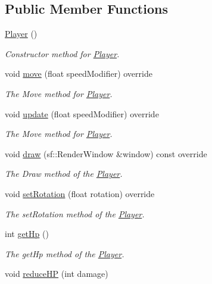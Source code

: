 \subsection*{Public Member Functions}
\begin{DoxyCompactItemize}
\item 
\hyperlink{class_player_affe0cc3cb714f6deb4e62f0c0d3f1fd8}{Player} ()
\begin{DoxyCompactList}\small\item\em Constructor method for \hyperlink{class_player}{Player}. \end{DoxyCompactList}\item 
void \hyperlink{class_player_a79a7509b3cde94c77b79247fa46b13dd}{move} (float speed\+Modifier) override
\begin{DoxyCompactList}\small\item\em The Move method for \hyperlink{class_player}{Player}. \end{DoxyCompactList}\item 
void \hyperlink{class_player_a70e7b6ef62c5b8080e454edcb15cacc8}{update} (float speed\+Modifier) override
\begin{DoxyCompactList}\small\item\em The Move method for \hyperlink{class_player}{Player}. \end{DoxyCompactList}\item 
void \hyperlink{class_player_a5e0147aee1248db63417987b9a203a9a}{draw} (sf\+::\+Render\+Window \&window) const override
\begin{DoxyCompactList}\small\item\em The Draw method of the \hyperlink{class_player}{Player}. \end{DoxyCompactList}\item 
void \hyperlink{class_player_af81c4b00747424065dae4984f4f6c57e}{set\+Rotation} (float rotation) override
\begin{DoxyCompactList}\small\item\em The set\+Rotation method of the \hyperlink{class_player}{Player}. \end{DoxyCompactList}\item 
int \hyperlink{class_player_aa6479f194f9bb44b09adaf3b04a5594d}{get\+Hp} ()
\begin{DoxyCompactList}\small\item\em The get\+Hp method of the \hyperlink{class_player}{Player}. \end{DoxyCompactList}\item 
void \hyperlink{class_player_ae03528c4ade65b66ed097a2b622d59a5}{reduce\+H\+P} (int damage)

\end{DoxyCompactItemize}
